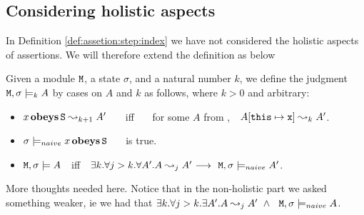 \documentclass[acmsmall,screen]{acmart}
\begin{document}
\begin{appendix}
\subsection{Considering holistic aspects}

In  Definition \ref{def:assetion:step:index} we have not considered the holistic aspects of assertions. We will therefore extend the definition as below

\begin{definition}
\label{def:assetion:hol:step:index}
 Given a module ${\mbox{\tt{M}}}$, a state $\sigma$, and a natural number $k$, we define the judgment ${\mbox{\tt{M}}}, \sigma \models_k A$ by cases on $A$  and $k$  as follows, where $k>0$ and arbitrary:

\begin{itemize}
\item
$ x \obeys {}\leadsto_{k+1} A'$ \ \ \  iff \ \ \
  for some $A$ from \prg{S},\ \    $A [{\mbox{\tt{this}}}\mapsto {\mbox{\tt{x}}}] \leadsto_{k} A'$.
\item
$\sigma \models_{naive} x \,\textbf{\textrm{obeys}}\, {\mbox{\tt{S}}}$ \ \ \  is true.
\item
${\mbox{\tt{M}}}, \sigma \models  A$\ \  iff\ \  $\exists k.  \forall j>k.  \forall A'. A \leadsto_{j} A'\ {\longrightarrow} \ \ {\mbox{\tt{M}}}, \sigma\models_{naive}  A'$.

\end{itemize}

 \end{definition}

More thoughts needed here. Notice that in the non-holistic part we asked something weaker, ie we had that 
$\exists k.  \forall j>k.  \exists A'. A \leadsto_{j} A'\ \wedge \ \ {\mbox{\tt{M}}}, \sigma\models_{naive}  A$.

\end{appendix}
\end{document}
